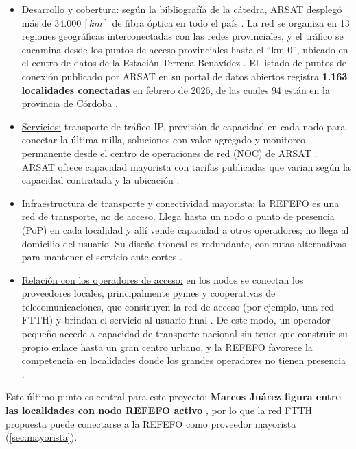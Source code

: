 \begin{itemize}
    \item \underline{Desarrollo y cobertura:} según la bibliografía de la cátedra, ARSAT desplegó más de $34.000 \, [km]$ de fibra óptica en todo el país \cite{libro_catedra}. La red se organiza en 13 regiones geográficas interconectadas con las redes provinciales, y el tráfico se encamina desde los puntos de acceso provinciales hasta el ``km 0'', ubicado en el centro de datos de la Estación Terrena Benavídez \cite{arsat_refefo}. El listado de puntos de conexión publicado por ARSAT en su portal de datos abiertos registra \textbf{1.163 localidades conectadas} en febrero de 2026, de las cuales 94 están en la provincia de Córdoba \cite{arsat_nodos}.
    \item \underline{Servicios:} transporte de tráfico IP, provisión de capacidad en cada nodo para conectar la última milla, soluciones con valor agregado y monitoreo permanente desde el centro de operaciones de red (NOC) de ARSAT \cite{arsat_refefo}. ARSAT ofrece capacidad mayorista con tarifas publicadas que varían según la capacidad contratada y la ubicación \cite{libro_catedra}.
    \item \underline{Infraestructura de transporte y conectividad mayorista:} la REFEFO es una red de transporte, no de acceso. Llega hasta un nodo o punto de presencia (PoP) en cada localidad y allí vende capacidad a otros operadores; no llega al domicilio del usuario. Su diseño troncal es redundante, con rutas alternativas para mantener el servicio ante cortes \cite{libro_catedra}.
    \item \underline{Relación con los operadores de acceso:} en los nodos se conectan los proveedores locales, principalmente pymes y cooperativas de telecomunicaciones, que construyen la red de acceso (por ejemplo, una red FTTH) y brindan el servicio al usuario final \cite{arsat_refefo}. De este modo, un operador pequeño accede a capacidad de transporte nacional sin tener que construir su propio enlace hasta un gran centro urbano, y la REFEFO favorece la competencia en localidades donde los grandes operadores no tienen presencia \cite{libro_catedra}.
\end{itemize}

Este último punto es central para este proyecto: \textbf{Marcos Juárez figura entre las localidades con nodo REFEFO activo} \cite{arsat_nodos}, por lo que la red FTTH propuesta puede conectarse a la REFEFO como proveedor mayorista (\autoref{sec:mayorista}).


